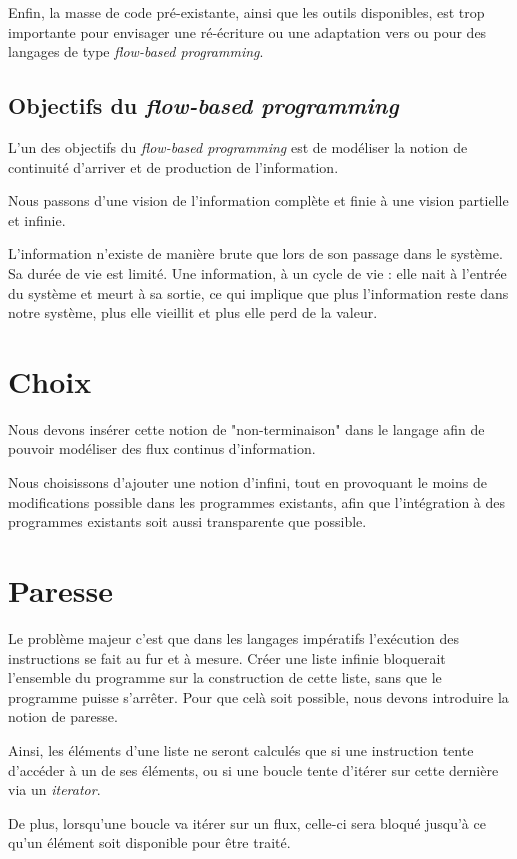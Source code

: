 \documentclass{article}
\begin{document}
Enfin, la masse de code pré-existante, ainsi que les outils disponibles,
est trop importante pour envisager une ré-écriture ou une adaptation
vers ou pour des langages de type \emph{flow-based programming}.

\subsection{Objectifs du \emph{flow-based programming}}
L'un des objectifs du \emph{flow-based programming} est de modéliser la notion de
continuité d'arriver et de production de l'information.

Nous passons d'une vision de l'information complète et finie à une vision partielle
et infinie.

L'information n'existe de manière brute que lors de son passage dans le système.
Sa durée de vie est limité.
Une information, à un cycle de vie : elle nait à l'entrée du système et meurt à sa
sortie, ce qui implique que plus l'information reste dans notre système, plus elle
vieillit et plus elle perd de la valeur.

\section{Choix}
Nous devons insérer cette notion de "non-terminaison" dans le langage afin de
pouvoir modéliser des flux continus d'information.

Nous choisissons d'ajouter une notion d'infini, tout en provoquant le moins de
modifications possible dans les programmes existants, afin que l'intégration à
des programmes existants soit aussi transparente que possible.

\section{Paresse}
Le problème majeur c'est que dans les langages impératifs l'exécution des instructions
se fait au fur et à mesure.
Créer une liste infinie bloquerait l'ensemble du programme sur la construction de
cette liste, sans que le programme puisse s'arrêter.
Pour que celà soit possible, nous devons introduire la notion de paresse.

Ainsi, les éléments d'une liste ne seront calculés que si une instruction tente
d'accéder à un de ses éléments, ou si une boucle tente d'itérer sur cette dernière
via un \emph{iterator}.

De plus, lorsqu'une boucle va itérer sur un flux, celle-ci sera bloqué jusqu'à ce
qu'un élément soit disponible pour être traité.
\end{document}
